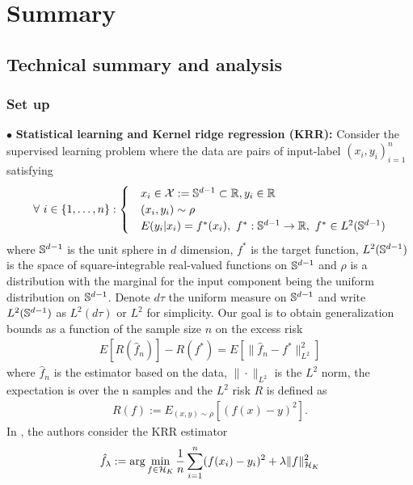 

\section{Summary}\label{section1}
\subsection{Technical summary and analysis}
\subsubsection{Set up}
$\bullet$ \textbf{Statistical learning and Kernel ridge regression (KRR):} Consider the supervised learning problem where the data are pairs of input-label $(x_i,y_i)^n_{i=1}$ satisfying
\begin{align}
\begin{alignedat}{3}
\forall\ i\in \{1,\ldots,n\}:
\begin{cases}
&x_i\in \mathcal{X}:=\mathbb{S}^{d-1}\subset\mathbb{R}, y_i\in \mathbb{R}\\
&(x_i,y_i)\sim \rho\\
&E(y_i|x_i) = f^*(x_i),\ f^*:\mathbb{S}^{d-1}\to \mathbb{R},\ f^*\in L^2(\mathbb{S}^{d-1})    
\end{cases}
\end{alignedat}
\end{align}
where $\mathbb{S}^{d-1}$ is the unit sphere in $d$ dimension, $f^*$ is the target function, $L^2(\mathbb{S}^{d-1})$ is the space of square-integrable real-valued functions on $\mathbb{S}^{d-1}$ and $\rho$ is a distribution with the marginal for the input component being the uniform distribution on $\mathbb{S}^{d-1}$. Denote $d\tau$ the uniform measure on $\mathbb{S}^{d-1}$ and write $L^2(\mathbb{S}^{d-1})$ as $L^2(d\tau)$ or $L^2$ for simplicity. Our goal is to obtain generalization bounds as a function of the sample size $n$ on the excess risk
\begin{align}
    E[R(\hat{f}_n)] - R(f^*) = E[\|\hat{f}_n-f^*\|^2_{L^2}]
\end{align}
where $\hat{f}_n$ is the estimator based on the data, $\|\cdot\|_{L^2}$ is the $L^2$ norm, the expectation is over the n samples and the $L^2$ risk $R$ is defined as
\begin{align}
    R(f):=E_{(x,y)\sim\rho}[(f(x)-y)^2].
\end{align}
In \cite{bietti2021sample}, the authors consider the KRR estimator
\begin{align}
    \hat{f}_\lambda := \arg\min_{f\in \mathcal{H}_K}\frac{1}{n}\sum_{i=1}^n(f(x_i)-y_i)^2 + \lambda\|f\|_{\mathcal{H}_K}^2
\end{align}
